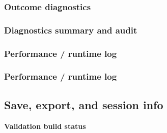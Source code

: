 \documentclass[
  11pt,
  letterpaper,
  DIV=11,
  numbers=noendperiod]{scrartcl}
\begin{document}
\subsubsection{Outcome diagnostics}\label{outcome-diagnostics}

\subsubsection{Diagnostics summary and
audit}\label{diagnostics-summary-and-audit}

\subsubsection{Performance / runtime log}\label{performance-runtime-log}

\subsubsection{Performance / runtime
log}\label{performance-runtime-log-1}

\subsection{Save, export, and session
info}\label{save-export-and-session-info}

\begin{center}\textbf{Validation build status}\end{center}
\end{document}
